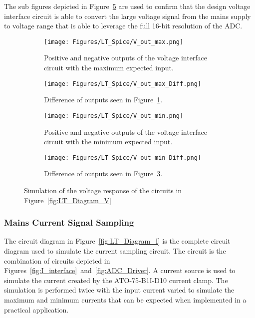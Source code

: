The sub figures depicted in Figure~\ref{fig:V_driver_simulation} are used to confirm that the design voltage interface circuit is able to convert the large voltage signal from the mains supply to voltage range that is able to leverage the full 16-bit resolution of the ADC.    

\begin{figure}[H]
     \centering
     \begin{subfigure}[b]{0.4\textwidth}
        \centering
        \texttt{[image: Figures/LT\_Spice/V\_out\_max.png]}
        \caption{Positive and negative outputs of the voltage interface circuit with the maximum expected input.}
        \label{fig:V_out_max}
     \end{subfigure}
     \hfill
     \begin{subfigure}[b]{0.4\textwidth}
        \centering
        \texttt{[image: Figures/LT\_Spice/V\_out\_max\_Diff.png]}
        \caption{Difference of outputs seen in Figure~\ref{fig:V_out_max}.}
        \label{fig:V_diff_max}
    \end{subfigure}
    \hfill
     \begin{subfigure}[b]{0.4\textwidth}
        \centering
        \texttt{[image: Figures/LT\_Spice/V\_out\_min.png]}
        \caption{Positive and negative outputs of the voltage interface circuit with the minimum expected input.}
        \label{fig:V_out_min}
    \end{subfigure}
    \hfill
     \begin{subfigure}[b]{0.4\textwidth}
        \centering
        \texttt{[image: Figures/LT\_Spice/V\_out\_min\_Diff.png]}
        \caption{Difference of outputs seen in Figure~\ref{fig:V_out_min}.}
        \label{fig:V_diff_min}
    \end{subfigure}
    \caption{Simulation of the voltage response of the circuits in Figure~\ref{fig:LT_Diagram_V}}
    \label{fig:V_driver_simulation}
\end{figure}

\subsubsection{Mains Current Signal Sampling}

The circuit diagram in Figure~\ref{fig:LT_Diagram_I} is the complete circuit diagram used to simulate the current sampling circuit. The circuit is the combination of circuits depicted in Figures~\ref{fig:I_interface}~and~\ref{fig:ADC_Driver}. A current source is used to simulate the current created by the ATO-75-B1I-D10 current clamp. The simulation is performed twice with the input current varied to simulate the maximum and minimum currents that can be expected when implemented in a practical application.  

